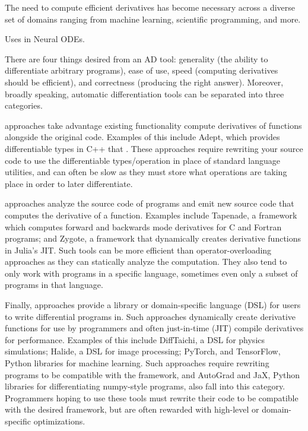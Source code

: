 The need to compute efficient derivatives has become necessary across a diverse set of domains ranging from machine learning, scientific programming, and more. 

Uses in Neural ODEs\cite{chen2018neural}.

There are four things desired from an AD tool: generality (the ability to differentiate arbitrary programs), ease of use, speed (computing derivatives should be efficient), and correctness (producing the right answer). Moreover, broadly speaking, automatic differentiation tools can be separated into three categories.

 approaches take advantage existing functionality compute derivatives of functions alongside the original code. Examples of this include Adept\cite{adept}, which provides differentiable types in C++ that . These approaches require rewriting your source code to use the differentiable types/operation in place of standard language utilities, and can often be slow as they must store what operations are taking place in order to later differentiate.

 approaches analyze the source code of programs and emit new source code that computes the derivative of a function. Examples include Tapenade\cite{TapenadeRef13}, a framework which computes forward and backwards mode derivatives for C and Fortran programs; and Zygote\cite{zygoteArxiv,zygoteDP,zygoteMlsys}, a framework that dynamically creates derivative functions in Julia's JIT. Such tools can be more efficient than operator-overloading approaches as they can statically analyze the computation. They also tend to only work with programs in a specific language, sometimes even only a subset of programs in that language.

Finally,  approaches provide a library or domain-specific language (DSL) for users to write differential programs in. Such approaches dynamically create derivative functions for use by programmers and often just-in-time (JIT) compile derivatives for performance. Examples of this include DiffTaichi\cite{hu2019difftaichi}, a DSL for physics simulations; Halide\cite{Li:2018:DPI}, a DSL for image processing; PyTorch\cite{paszke2017automatic}, 
and TensorFlow\cite{abadi2016tensorflow}, Python libraries for machine learning. Such approaches require rewriting programs to be compatible with the framework, and AutoGrad\cite{maclaurin2015autograd} and JaX\cite{jax2018github}, Python libraries for differentiating numpy-style programs, also fall into this category. Programmers hoping to use these tools must rewrite their code to be compatible with the desired framework, but are often rewarded with high-level or domain-specific optimizations.

